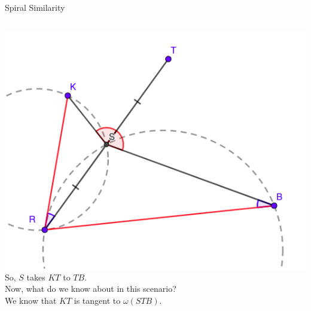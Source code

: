 \documentclass{beamer}
\begin{document}
\begin{frame}{Spiral Similarity}
	\begin{columns}
		\includegraphics[scale=0.34]{spi5.png}
		So, $S$ takes $KT$ to $TB$.\\
		\phantom{Spacing}
		Now, what do we know about in this scenario?\\
		\phantom{Spacing}
		We know that $KT$ is tangent to $\omega(STB)$.
	\end{columns}
\end{frame}
\end{document}
